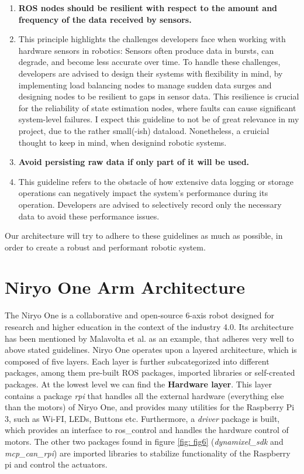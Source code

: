\documentclass[%
paper=A4,               %
twoside=true,           %
openright,              %
11pt,                   %
bibliography=totoc,     %
titlepage=on,           %
DIV=12,                 %
BCOR=1.5cm,             %
parskip=half,            %
final
]{scrreprt}
\begin{document}
\begin{enumerate}[leftmargin=9mm, align=left]
		\item \textbf{ROS nodes should be resilient with respect to the amount and frequency of the data received by sensors.} 
		\item[] This principle highlights the challenges developers face when working with hardware sensors in robotics: Sensors often produce data in bursts, can degrade, and become less accurate over time. To handle these challenges, developers are advised to design their systems with flexibility in mind, by implementing load balancing nodes to manage sudden data surges and designing nodes to be resilient to gaps in sensor data. This resilience is crucial for the reliability of state estimation nodes, where faults can cause significant system-level failures. I expect this guideline to not be of great relevance in my project, due to the rather small(-ish) dataload. Nonetheless, a cruicial thought to keep in mind, when designind robotic systems. \autocite{malavoltaHowYouArchitect2020}
		
		\item \textbf{Avoid persisting raw data if only part of it will be used.}
		\item[] This guideline refers to the obstacle of how extensive data logging or storage operations can negatively impact the system's performance during its operation. Developers are advised to selectively record only the necessary data to avoid these performance issues. \autocite{malavoltaHowYouArchitect2020}
		
		
	\end{enumerate}
	
	Our architecture will try to adhere to these guidelines as much as possible, in order to create a robust and performant robotic system.
	
	
	\section{Niryo One Arm Architecture}
	The Niryo One is a collaborative and open-source 6-axis robot designed for research and higher education in the context of the industry 4.0.
	Its architecture has been mentioned by Malavolta et al. as an example, that adheres very well to above stated guidelines. \autocite{malavoltaHowYouArchitect2020} Niryo One operates upon a layered architecture, which is composed of five layers. Each layer is further subcategorized into different packages, among them pre-built ROS packages, imported libraries or self-created packages. \newline
	At the lowest level we can find the \textbf{Hardware layer}. This layer contains a package \textit{rpi} that handles all the external hardware (everything else than the motors) of Niryo One, and provides many utilities for the Raspberry Pi 3, such as Wi-FI, LEDs, Buttons etc. Furthermore, a \textit{driver} package is built, which provides an interface to ros\_control and handles the hardware control of motors. The other two packages found in figure \ref{fig: fig6} (\textit{dynamixel\_sdk} and \textit{mcp\_can\_rpi}) are imported libraries to stabilize functionality of the Raspberry pi and control the actuators. \autocite{roboticsNiryoOneROS2024} \newline
	
\end{document}

